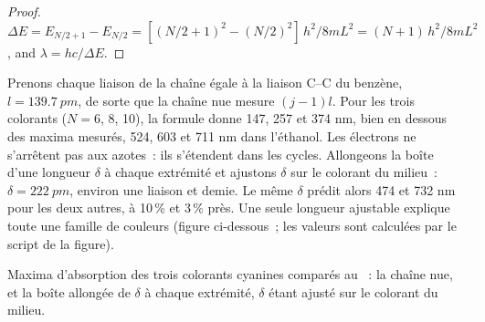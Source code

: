\begin{proof}
$\Delta E = E_{N/2+1} - E_{N/2} = [(N/2+1)^2 - (N/2)^2]\,h^2/8mL^2 =
(N+1)\,h^2/8mL^2$, and $\lambda = hc/\Delta E$.
\end{proof}

\begin{example}\label{ex:b3:quantum-model-systems:dyes}
Prenons chaque liaison de la chaîne égale à la liaison C--C du benzène,
$l = \qty{139.7}{pm}$, de sorte que la chaîne nue mesure $(j - 1)l$. Pour
les trois colorants ($N = 6$, 8, 10), la formule donne 147, 257 et 374 nm,
bien en dessous des maxima mesurés, 524, 603 et 711 nm dans l'éthanol.
Les électrons ne s'arrêtent pas aux azotes~: ils s'étendent dans les
cycles. Allongeons la boîte d'une longueur $\delta$ à chaque extrémité et
ajustons $\delta$ sur le colorant du milieu~:
$\delta = \qty{222}{pm}$, environ une liaison et demie. Le même $\delta$
prédit alors 474 et 732 nm pour les deux autres, à 10\,\% et 3\,\% près.
Une seule longueur ajustable explique toute une famille de couleurs
(figure ci-dessous~; les valeurs sont calculées par le script de la
figure).
\end{example}

\begin{omfigure}

{\small Maxima d'absorption des trois colorants cyanines comparés au
~: la chaîne nue, et la boîte allongée de
$\delta$ à chaque extrémité, $\delta$ étant ajusté sur le colorant du
milieu.}
\end{omfigure}

